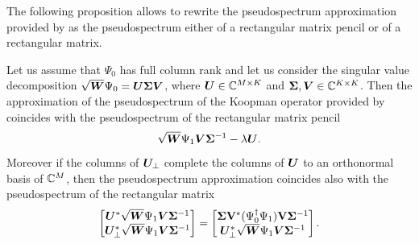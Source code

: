 The following proposition allows to rewrite the pseudospectrum approximation provided by  as the pseudospectrum either of a rectangular matrix pencil or of a rectangular matrix.
\begin{prop}
\label{prop_pseudospectrum}
Let us assume that $\Psi_0$ has full column rank and let us consider the singular value decomposition $\sqrt{\vb*{W}}\Psi_0 = \vb*{U}\bm{\Sigma}\vb*{V}$, where $\vb*{U}\in\mathbb{C}^{M\times K}$ and $\bm{\Sigma},\vb*{V}\in\mathbb{C}^{K\times K}$. Then the approximation of the pseudospectrum of the Koopman operator provided by  coincides with the pseudospectrum of the rectangular matrix pencil
\begin{equation}
    \sqrt{\vb*{W}}\Psi_1 \vb*{V}\bm{\Sigma}^{-1} - \lambda\vb*{U}.
\end{equation}
Moreover if the columns of $\vb*{U}_{\perp}$ complete the columns of $\vb*{U}$ to an orthonormal basis of $\mathbb{C}^{M}$, then the pseudospectrum approximation coincides also with the pseudospectrum of the rectangular matrix
\begin{equation}
    \begin{bmatrix}
    \vb*{U}^*\sqrt{\vb*{W}}\Psi_1 \vb*{V}\bm{\Sigma}^{-1}\\
    \vb*{U}_{\perp}^*\sqrt{\vb*{W}}\Psi_1 \vb*{V}\bm{\Sigma}^{-1}
    \end{bmatrix} = 
    \begin{bmatrix}
    \bm{\Sigma}\vb{V}^*(\Psi_0^\dagger \Psi_1)\vb{V}\bm{\Sigma}^{-1}\\
    \vb*{U}_{\perp}^*\sqrt{\vb*{W}}\Psi_1 \vb*{V}\bm{\Sigma}^{-1}
    \end{bmatrix}.
\end{equation}
\end{prop}
